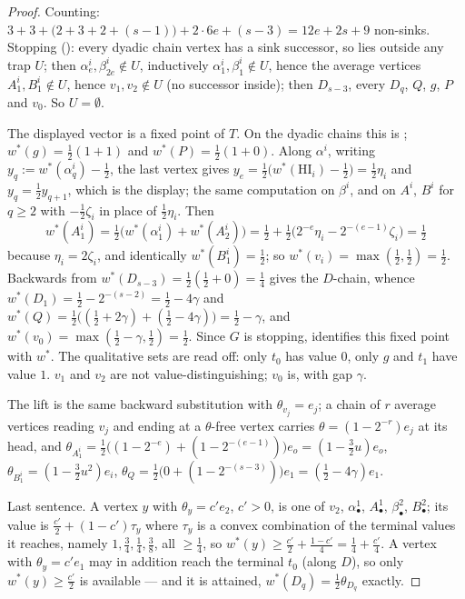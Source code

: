 \begin{proof}
Counting: $3+3+\bigl(2+3+2+(s-1)\bigr)+2\cdot6e+(s-3)=12e+2s+9$
non-sinks. Stopping (): every dyadic chain vertex has
a sink successor, so lies outside any trap $U$; then
$\alpha^{i}_e,\beta^{i}_{2e}\notin U$, inductively $\alpha^{i}_1,
\beta^{i}_1\notin U$, hence the average vertices $A^{i}_1,B^{i}_1\notin U$,
hence $v_1,v_2\notin U$ (no successor inside); then $D_{s-3}$, every
$D_q$, $Q$, $g$, $P$ and $v_0$. So $U=\emptyset$.

The displayed vector is a fixed point of $T$. On the dyadic chains this is
; $w^\ast(g)=\tfrac12(1+1)$ and $w^\ast(P)=\tfrac12(1+0)$.
Along $\alpha^{i}$, writing $y_q:=w^\ast(\alpha^{i}_q)-\tfrac12$, the last
vertex gives $y_e=\tfrac12\bigl(w^\ast(\mathrm{HI}_i)-\tfrac12\bigr)=\tfrac12\eta_i$
and $y_q=\tfrac12y_{q+1}$, which is the display; the same computation on
$\beta^{i}$, and on $A^{i}$, $B^{i}$ for $q\ge2$ with
$-\tfrac12\zeta_i$ in place of $\tfrac12\eta_i$. Then
\[
  w^\ast(A^{i}_1)=\tfrac12\bigl(w^\ast(\alpha^{i}_1)+w^\ast(A^{i}_2)\bigr)
  =\tfrac12+\tfrac12\bigl(2^{-e}\eta_i-2^{-(e-1)}\zeta_i\bigr)=\tfrac12
\]
because $\eta_i=2\zeta_i$, and identically $w^\ast(B^{i}_1)=\tfrac12$;
so $w^\ast(v_i)=\max(\tfrac12,\tfrac12)=\tfrac12$. Backwards from
$w^\ast(D_{s-3})=\tfrac12(\tfrac12+0)=\tfrac14$ gives the $D$-chain,
whence $w^\ast(D_1)=\tfrac12-2^{-(s-2)}=\tfrac12-4\gamma$ and
$w^\ast(Q)=\tfrac12\bigl((\tfrac12+2\gamma)+(\tfrac12-4\gamma)\bigr)
=\tfrac12-\gamma$, and $w^\ast(v_0)=\max(\tfrac12-\gamma,\tfrac12)=\tfrac12$.
Since $G$ is stopping,  identifies this fixed point
with $w^\ast$. The qualitative sets are read off: only $t_0$ has value
$0$, only $g$ and $t_1$ have value $1$. $v_1$ and $v_2$ are not
value-distinguishing; $v_0$ is, with gap $\gamma$.

The lift is the same backward substitution with $\theta_{v_j}=e_j$; a
chain of $r$ average vertices reading $v_j$ and ending at a
$\theta$-free vertex carries $\theta=(1-2^{-r})e_j$ at its head, and
$\theta_{A^{i}_1}=\tfrac12\bigl((1-2^{-e})+(1-2^{-(e-1)})\bigr)e_o
=(1-\tfrac32u)e_o$, $\theta_{B^{i}_1}=(1-\tfrac32u^{2})e_i$,
$\theta_Q=\tfrac12\bigl(0+(1-2^{-(s-3)})\bigr)e_1=(\tfrac12-4\gamma)e_1$.

Last sentence. A vertex $y$ with $\theta_y=c'e_2$, $c'>0$, is one of
$v_2$, $\alpha^{1}_\bullet$, $A^{1}_\bullet$, $\beta^{2}_\bullet$,
$B^{2}_\bullet$; its value is $\tfrac{c'}2+(1-c')\tau_y$ where $\tau_y$
is a convex combination of the terminal values it reaches, namely
$1,\tfrac34,\tfrac14,\tfrac38$, all $\ge\tfrac14$, so
$w^\ast(y)\ge\tfrac{c'}2+\tfrac{1-c'}4=\tfrac14+\tfrac{c'}4$. A vertex
with $\theta_y=c'e_1$ may in addition reach the terminal $t_0$ (along
$D$), so only $w^\ast(y)\ge\tfrac{c'}2$ is available --- and it is
attained, $w^\ast(D_q)=\tfrac12\theta_{D_q}$ exactly.
\end{proof}

